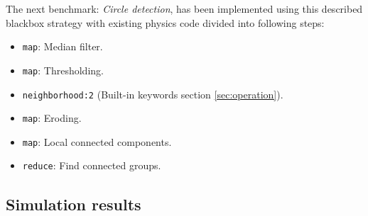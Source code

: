 \vspace*{3mm}
\noindent
The next benchmark: \textit{Circle detection}, has been implemented using this described blackbox strategy with existing physics code divided into following steps:
\begin{itemize}
	\item \texttt{map}: Median filter.
	\item \texttt{map}: Thresholding.
	\item \texttt{neighborhood:2} (Built-in keywords section \ref{sec:operation}).
	\item \texttt{map}: Eroding.
	\item \texttt{map}: Local connected components.
	\item \texttt{reduce}: Find connected groups.
\end{itemize}

\subsection*{Simulation results}

